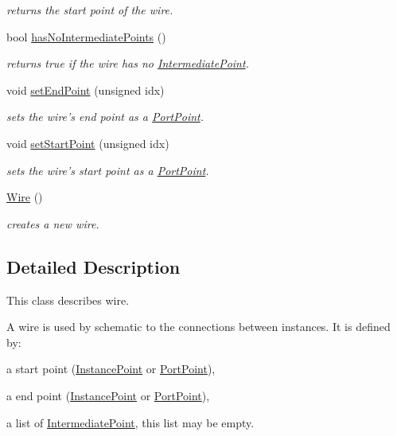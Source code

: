 \begin{DoxyCompactItemize}
\begin{DoxyCompactList}\small\item\em returns the start point of the wire. \end{DoxyCompactList}\item 
\hypertarget{class_open_chams_1_1_wire_abe5aa44c424e8b7bee9645af10ee0a23}{bool \hyperlink{class_open_chams_1_1_wire_abe5aa44c424e8b7bee9645af10ee0a23}{has\-No\-Intermediate\-Points} ()}\label{class_open_chams_1_1_wire_abe5aa44c424e8b7bee9645af10ee0a23}

\begin{DoxyCompactList}\small\item\em returns true if the wire has no \hyperlink{class_open_chams_1_1_intermediate_point}{Intermediate\-Point}. \end{DoxyCompactList}\item 
void \hyperlink{class_open_chams_1_1_wire_a25430c9acf02567164074625ba56e5ef}{set\-End\-Point} (unsigned idx)
\begin{DoxyCompactList}\small\item\em sets the wire's end point as a \hyperlink{class_open_chams_1_1_port_point}{Port\-Point}. \end{DoxyCompactList}\item 
void \hyperlink{class_open_chams_1_1_wire_a37335a2ff923eb45ff5d4f2f4e41b8b1}{set\-Start\-Point} (unsigned idx)
\begin{DoxyCompactList}\small\item\em sets the wire's start point as a \hyperlink{class_open_chams_1_1_port_point}{Port\-Point}. \end{DoxyCompactList}\item 
\hypertarget{class_open_chams_1_1_wire_a66b8cdcb08d46fe66f1b910ff05ea328}{\hyperlink{class_open_chams_1_1_wire_a66b8cdcb08d46fe66f1b910ff05ea328}{Wire} ()}\label{class_open_chams_1_1_wire_a66b8cdcb08d46fe66f1b910ff05ea328}

\begin{DoxyCompactList}\small\item\em creates a new wire. \end{DoxyCompactList}\end{DoxyCompactItemize}


\subsection{Detailed Description}
This class describes wire.

A wire is used by schematic to the connections between instances. It is defined by\-:
\begin{DoxyItemize}
\item a start point (\hyperlink{class_open_chams_1_1_instance_point}{Instance\-Point} or \hyperlink{class_open_chams_1_1_port_point}{Port\-Point}),
\item a end point (\hyperlink{class_open_chams_1_1_instance_point}{Instance\-Point} or \hyperlink{class_open_chams_1_1_port_point}{Port\-Point}),
\item a list of \hyperlink{class_open_chams_1_1_intermediate_point}{Intermediate\-Point}, this list may be empty.
\end{DoxyItemize}

